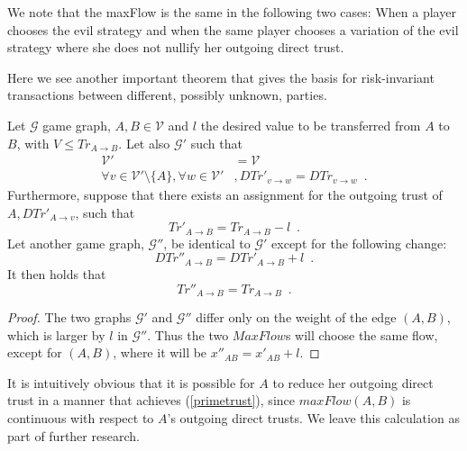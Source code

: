 \documentclass[11pt]{llncs}
\theoremstyle{definition}
\begin{document}
     We note that the maxFlow is the same in the following two cases: When a player chooses the evil strategy and when the
     same player chooses a variation of the evil strategy where she does not nullify her outgoing direct trust.

     Here we see another important theorem that gives the basis for risk-invariant transactions between different, possibly
     unknown, parties.
     \begin{theorem}
     \label{riskinv}
        Let $\mathcal{G}$ game graph, $A, B \in \mathcal{V}$ and $l$ the desired value to be transferred from $A$ to $B$,
        with $V \leq Tr_{A \rightarrow B}$. Let also $\mathcal{G}'$ such that
        \begin{align*}
           \mathcal{V}' &= \mathcal{V} \\
           \forall v \in \mathcal{V}' \setminus \{A\}, \forall w \in \mathcal{V}'&, DTr'_{v \rightarrow w} =
           DTr_{v \rightarrow w} \enspace.
        \end{align*}
        Furthermore, suppose that there exists an assignment for the outgoing trust of $A, DTr'_{A \rightarrow v}$, such that
        \begin{equation}
        \label{primetrust}
           Tr'_{A \rightarrow B} = Tr_{A \rightarrow B} - l \enspace.
        \end{equation}
        Let another game graph, $\mathcal{G}''$, be identical to $\mathcal{G}'$ except for the following change:
        \begin{equation*}
           DTr''_{A \rightarrow B} = DTr'_{A \rightarrow B} + l \enspace.
        \end{equation*}
        It then holds that
        \begin{equation*}
           Tr''_{A \rightarrow B} = Tr_{A \rightarrow B} \enspace.
        \end{equation*}
     \end{theorem}
     \begin{proof}
        The two graphs $\mathcal{G}'$ and $\mathcal{G}''$ differ only on the weight of the edge $\left(A, B\right)$, which is
        larger by $l$ in $\mathcal{G}''$. Thus the two $MaxFlow$s will choose the same flow, except for $\left(A, B\right)$,
        where it will be $x''_{AB} = x'_{AB} + l$.
     \end{proof}
     It is intuitively obvious that it is possible for $A$ to reduce her outgoing direct trust in a manner that achieves
     (\ref{primetrust}), since $maxFlow\left(A, B\right)$ is continuous with respect to $A$'s outgoing direct trusts. We
     leave this calculation as part of further research.
\end{document}
